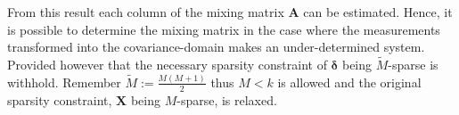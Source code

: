 From this result each column of the mixing matrix $\mathbf{A}$ can be estimated. 
Hence, it is possible to determine the mixing matrix in the case where the measurements transformed into the covariance-domain makes an under-determined system.
Provided however that the necessary sparsity constraint of $\boldsymbol{\delta}$ being $\widetilde{M}$-sparse is withhold. 
Remember $\widetilde{M} := \frac{M(M+1)}{2}$ thus $M < k$ is allowed and the original sparsity constraint, $\mathbf{X}$ being $M$-sparse, is relaxed. 





